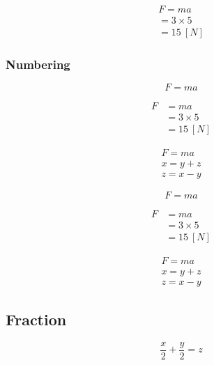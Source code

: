 \begin{gather*}
    F   = ma \\
        = 3\times5 \\
        = 15\ [N]
\end{gather*}

\subsubsection{Numbering}
\begin{TeXlstlisting}
\begin{equation}
    F = ma 
\end{equation}

\begin{align}
    F   &= ma \nonumber \\
        &= 3\times5 \nonumber \\
        &= 15\ [N]
\end{align}

\begin{gather}
    F   = ma \\
        x = y+z \\
        z = x-y
\end{gather}
\end{TeXlstlisting}


\begin{equation}
    F = ma 
\end{equation}

\begin{align}
    F   &= ma \nonumber \\
        &= 3\times5 \nonumber \\
        &= 15\ [N]
\end{align}

\begin{gather}
    F   = ma \\
       x = y+z \\
       z = x-y
\end{gather}

\subsection{Fraction}

\begin{TeXlstlisting}
\begin{equation}
    \frac{x}{2}+\frac{y}{2}=z
\end{equation}
\end{TeXlstlisting}

